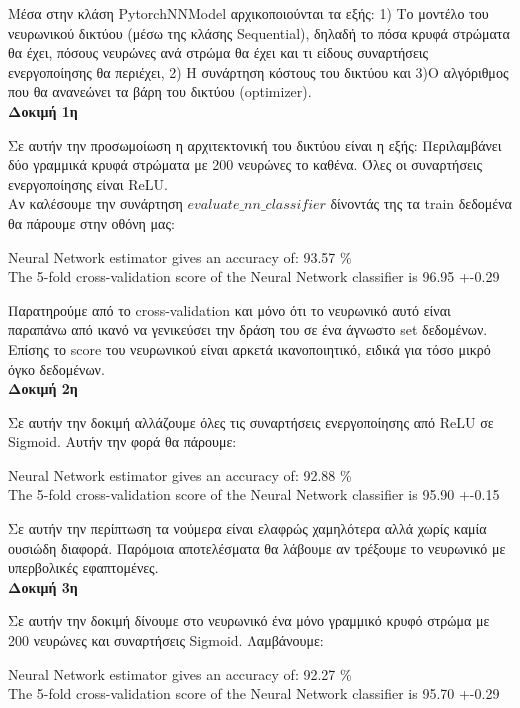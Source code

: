 \documentclass[11pt]{article} %
\begin{document}
Μέσα στην κλάση PytorchNNModel αρχικοποιούνται τα εξής: 1) Το μοντέλο του νευρωνικού δικτύου (μέσω της κλάσης Sequential), δηλαδή το πόσα κρυφά στρώματα θα έχει, πόσους νευρώνες ανά στρώμα θα έχει και τι είδους συναρτήσεις ενεργοποίησης θα περιέχει, 2) Η συνάρτηση κόστους του δικτύου και 3)Ο αλγόριθμος που θα ανανεώνει τα βάρη του δικτύου (optimizer).\\


\textbf{Δοκιμή 1η}

Σε αυτήν την προσωμοίωση η αρχιτεκτονική του δικτύου είναι η εξής: Περιλαμβάνει δύο γραμμικά κρυφά στρώματα με 200 νευρώνες το καθένα. Όλες οι συναρτήσεις ενεργοποίησης είναι ReLU.\\

Αν καλέσουμε την συνάρτηση $evaluate\_nn\_classifier$ δίνοντάς της τα train δεδομένα θα πάρουμε στην οθόνη μας:\\
\begin{center}
Neural Network estimator gives an accuracy of: 93.57 \% \\
The 5-fold cross-validation score of the Neural Network classifier is 96.95 +-0.29
\end{center}

Παρατηρούμε από το cross-validation και μόνο ότι το νευρωνικό αυτό είναι παραπάνω από ικανό να γενικεύσει την δράση του σε ένα άγνωστο set δεδομένων. Επίσης το score του νευρωνικού είναι αρκετά ικανοποιητικό, ειδικά για τόσο μικρό όγκο δεδομένων.\\

\textbf{Δοκιμή 2η}

Σε αυτήν την δοκιμή αλλάζουμε όλες τις συναρτήσεις ενεργοποίησης από ReLU σε Sigmoid. Αυτήν την φορά θα πάρουμε:\\
\begin{center}
Neural Network estimator gives an accuracy of: 92.88 \% \\
The 5-fold cross-validation score of the Neural Network classifier is 95.90 +-0.15
\end{center}

Σε αυτήν την περίπτωση τα νούμερα είναι ελαφρώς χαμηλότερα αλλά χωρίς καμία ουσιώδη διαφορά. Παρόμοια αποτελέσματα θα λάβουμε αν τρέξουμε το νευρωνικό με υπερβολικές εφαπτομένες.\\

\textbf{Δοκιμή 3η}

Σε αυτήν την δοκιμή δίνουμε στο νευρωνικό ένα μόνο γραμμικό κρυφό στρώμα με 200 νευρώνες και συναρτήσεις Sigmoid. Λαμβάνουμε:\\
\begin{center}
Neural Network estimator gives an accuracy of: 92.27 \% \\
The 5-fold cross-validation score of the Neural Network classifier is 95.70 +-0.29
\end{center}
\end{document}
